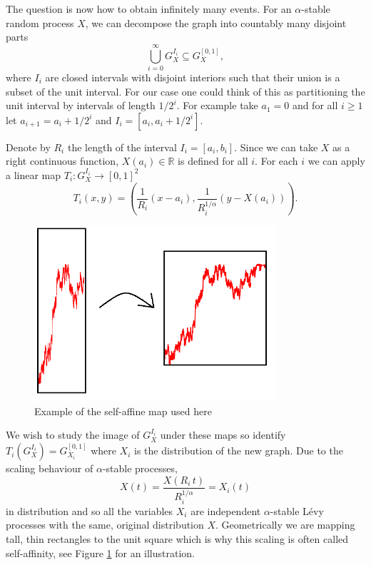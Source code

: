 The question is now how to obtain infinitely many events. For an $\alpha$-stable random process $X$, we can decompose the graph into countably many disjoint parts
\[
\bigcup_{i=0}^\infty G_X^{I_i}\subseteq G_X^{[0,1]},
\]
where $I_i$ are closed intervals with disjoint interiors such that their union is a subset of the unit interval. For our case one could think of this as partitioning the unit interval by intervals of length $1/2^i$. For example take $a_1=0$ and for all $i\geq 1$ let $a_{i+1}=a_i+1/2^i$ and $I_i=[a_i,a_i+1/2^{i}].$

Denote by $R_i$ the length of the interval $I_i=[a_i,b_i]$. Since we can take $X$ as a right continuous function, $X(a_i)\in\mathbb{R}$ is defined for all $i$. For each $i$ we can apply a linear map $T_i: G_X^{I_i} \rightarrow [0,1]^2$
\[
T_i(x,y)=\left(\frac{1}{R_i}(x-a_i),\frac{1}{R_i^{1/\alpha}}\left(y-X(a_i)\right)\right).
\]

\begin{figure}[ht]
    \centering
    \includegraphics[width=0.8\textwidth]{pics/ch-brownian/memes-map.png}
    \caption{Example of the self-affine map used here}
    \label{fig:rectangles-graph}
\end{figure}

We wish to study the image of $G_X^{I_i}$ under these maps so identify $T_i(G_X^{I_i})=G_{X_i}^{[0,1]}$ where $X_i$ is the distribution of the new graph. Due to the scaling behaviour of $\alpha$-stable processes, 
\[
X(t) = \frac{X(R_i\, t)}{R_i^{1/\alpha}} = X_i(t)
\]
in distribution and so all the variables $X_i$ are independent $\alpha$-stable L\'evy processes with the same, original distribution $X$. Geometrically we are mapping tall, thin rectangles to the unit square which is why this scaling is often called self-affinity, see Figure \ref{fig:rectangles-graph} for an illustration. 

